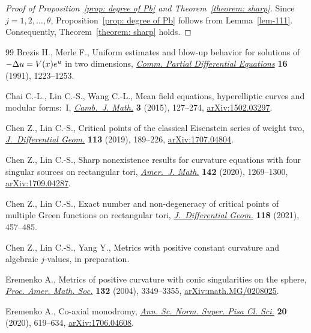 \documentclass[11pt]{article}
\numberwithin{equation}{section}
\numberwithin{equation}{section}
\begin{document}
\begin{proof}[Proof of Proposition~\ref{prop: degree of Pb} and Theorem~\ref{theorem: sharp}] Since $j=1,2,\dots, \theta$, Proposition~\ref{prop: degree of Pb} follows from Lemma~\ref{lem-111}. Consequently, Theorem~\ref{theorem: sharp} holds.
\end{proof}
\begin{thebibliography}{99}
Brezis H., Merle F., Uniform estimates and blow-up behavior for solutions of
 {$-\Delta u=V(x){\rm e}^u$} in two dimensions, \href{https://doi.org/10.1080/03605309108820797}{\textit{Comm. Partial Differential
 Equations}} \textbf{16} (1991), 1223--1253.

Chai C.-L., Lin C.-S., Wang C.-L., Mean field equations, hyperelliptic curves and
 modular forms:~{I}, \href{https://doi.org/10.4310/CJM.2015.v3.n1.a3}{\textit{Camb.~J. Math.}} \textbf{3} (2015), 127--274,
 \href{https://arxiv.org/abs/1502.03297}{arXiv:1502.03297}.

Chen Z., Lin C.-S., Critical points of the classical {E}isenstein series of
 weight two, \href{https://doi.org/10.4310/jdg/1571882423}{\textit{J.~Differential Geom.}} \textbf{113} (2019), 189--226,
 \href{https://arxiv.org/abs/1707.04804}{arXiv:1707.04804}.

Chen Z., Lin C.-S., Sharp nonexistence results for curvature equations with four
 singular sources on rectangular tori, \href{https://doi.org/10.1353/ajm.2020.0028}{\textit{Amer.~J. Math.}} \textbf{142}
 (2020), 1269--1300, \href{https://arxiv.org/abs/1709.04287}{arXiv:1709.04287}.

Chen Z., Lin C.-S., Exact number and non-degeneracy of critical points of
 multiple {G}reen functions on rectangular tori, \href{https://doi.org/10.4310/jdg/1625860623}{\textit{J.~Differential
 Geom.}} \textbf{118} (2021), 457--485.

Chen Z., Lin C.-S., Yang Y., Metrics with positive constant curvature and
 algebraic $j$-values, {i}n preparation.

Eremenko A., Metrics of positive curvature with conic singularities on the
 sphere, \href{https://doi.org/10.1090/S0002-9939-04-07439-8}{\textit{Proc. Amer. Math. Soc.}} \textbf{132} (2004), 3349--3355,
 \href{https://arxiv.org/abs/math.MG/0208025}{arXiv:math.MG/0208025}.

Eremenko A., Co-axial monodromy, \href{https://doi.org/10.2422/2036-2145.201706_022}{\textit{Ann. Sc. Norm. Super. Pisa Cl. Sci.}}
 \textbf{20} (2020), 619--634, \href{https://arxiv.org/abs/1706.04608}{arXiv:1706.04608}.


\end{thebibliography}
\end{document}

